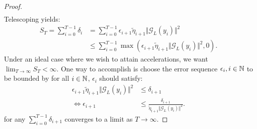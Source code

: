 \begin{proof}
\begin{align*}
        \end{align*}
        Telescoping yields: 
        \begin{align*}
            S_{T} = 
            \sum_{i = 0}^{T- 1} \delta_i 
            &= 
            \sum_{i = 0}^{T - 1} \epsilon_{i + 1}\tilde\eta_{i + 1}\Vert \mathcal G_L(y_i)\Vert^2
            \\
            &\le \sum_{i = 0}^{T - 1}\max(\epsilon_{i + 1} \tilde\eta_{i + 1}\Vert \mathcal G_L(y_i)\Vert^2, 0). 
        \end{align*}
        Under an ideal case where we wish to attain accelerations, we want $\lim_{T \rightarrow \infty} S_T < \infty$. 
        One way to accomplish is choose the error sequence $\epsilon_i, i \in \mathbb N$ to be bounded by for all $i \in \mathbb N$, $\epsilon_i$ should satisfy: 
        \begin{align*}
            \epsilon_{i + 1}\tilde \eta_{i + 1}
            \Vert \mathcal G_L(y_i)\Vert^2 
            &\le \delta_{i + 1}
            \\
            \iff 
            \epsilon_{i + 1}
            &\le 
            \frac{\delta_{i + 1} }{\tilde\eta_{t + 1}\Vert \mathcal G_L(y_i)\Vert^2}. 
        \end{align*}
        for any $\sum_{i = 0}^{T - 1}\delta_{i + 1}$ converges to a limit as $T \rightarrow \infty$. 

    \end{proof}

